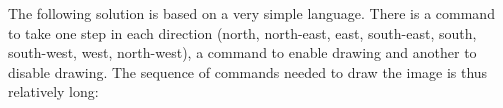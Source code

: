The following solution is based on a very simple language. There is a command to take one step in each direction (north, north-east, east, south-east, south, south-west, west, north-west), a command to enable drawing and another to disable drawing. The sequence of commands needed to draw the image is thus relatively long:


\inputminted{csharp}{\context/answer/Canvas.cs}
\inputminted{csharp}{\context/answer/Turtle.cs}

